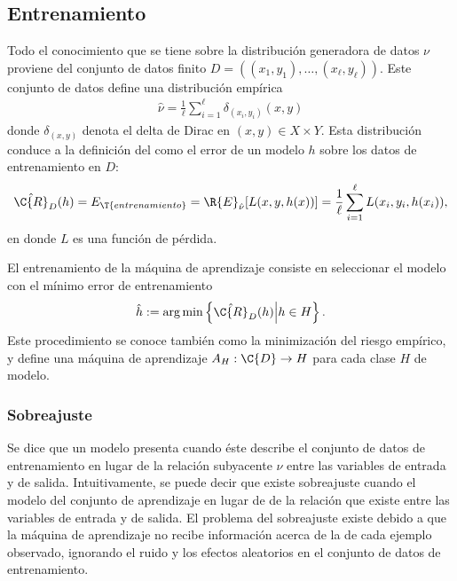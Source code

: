 \subsection{Entrenamiento}
%
Todo el conocimiento que se tiene sobre la distribución generadora de
datos $\nu$ proviene del conjunto de datos finito
$D=\left((x_1,y_1),\ldots,(x_\ell,y_\ell)\right)$.  Este conjunto de
datos define una distribución empírica
%
\begin{align}
  \hat{\nu}=\frac{1}{\ell}\sum_{i=1}^{\ell}\delta_{(x_i,y_i)}(x,y)
\end{align}
%
donde $\delta_{(x,y)}$ denota el delta de Dirac en
$(x,y)\in{}X\times{}Y$.  Esta distribución conduce a la definición del
 como el error de un modelo $h$ sobre los
datos de entrenamiento en $D$:
%
\begin{align}
  \hat{\C{R}}_D(h)=E_\T{entrenamiento}=\R{E}_{\hat{\nu}}[L(x,y,h(x))]
  =\frac{1}{\ell}\sum_{i=1}^\ell L(x_i, y_i, h(x_i)),
\end{align}
%
en donde $L$ es una función de pérdida.

El entrenamiento de la máquina de aprendizaje consiste en
seleccionar el modelo con el mínimo error de entrenamiento
%
\begin{align}
  \hat{h}:=\arg \min \left\{ \hat{\C{R}}_D(h)\middle|h \in H\right\}.
\end{align}
%
Este procedimiento se conoce también como la minimización del riesgo
empírico, y define una máquina de aprendizaje
$A_H:\C{D}\rightarrow{}H$ para cada clase $H$ de modelo.
%
\subsubsection{Sobreajuste}
%
Se dice que un modelo presenta  cuando éste describe
el conjunto de datos de entrenamiento en lugar de la relación
subyacente $\nu$ entre las variables de entrada y de salida.
Intuitivamente, se puede decir que existe sobreajuste cuando el modelo
 del conjunto de aprendizaje en lugar de
 de la relación que existe entre las variables
de entrada y de salida. El problema del
sobreajuste existe debido a que la máquina de aprendizaje no recibe
información acerca de la  de cada ejemplo observado,
ignorando el ruido y los efectos aleatorios en el conjunto de datos de
entrenamiento.
